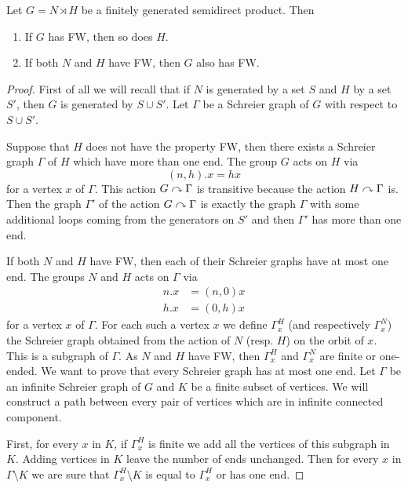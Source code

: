 \begin{lem}\label{Lemma:Semidirect_ends}
Let $G = N \rtimes H$ be a finitely generated semidirect product. Then
\begin{enumerate}
\item If $G$ has FW, then so does $H$.
\item If both $N$ and $H$ have FW, then $G$ also has FW.
\end{enumerate}
\end{lem}
%
\begin{proof}
First of all we will recall that if $N$ is generated by a set $S$ and $H$ by a set $S'$, then $G$ is generated by $S \cup S'$. Let $\Gamma$ be a Schreier graph of $G$ with respect to $S \cup S'$.

Suppose that $H$ does not have the property FW, then there exists a Schreier graph $\Gamma$ of $H$ which have more than one end. The group $G$ acts on $H$ via 
\begin{equation*}
(n,h).x = hx 
\end{equation*}
for a vertex $x$ of $\Gamma$. This action $G \curvearrowright \Gamma$ is transitive because the action $H \curvearrowright \Gamma$ is. Then the graph $\Gamma'$ of the action $G \curvearrowright \Gamma$ is exactly the graph $\Gamma$ with some additional loops coming from the generators on $S'$ and then $\Gamma'$ has more than one end.

If both $N$ and $H$ have FW, then each of their Schreier graphs have at most one end. The groups $N$ and $H$ acts on $\Gamma$ via
\begin{align*}
n.x &= (n,0)x \\
h.x &= (0,h)x
\end{align*}
for a vertex $x$ of $\Gamma$. For each such a vertex $x$ we define $\Gamma_x^H$ (and respectively $\Gamma_x^N$) the Schreier graph obtained from the action of $N$ (resp. $H$) on the orbit of $x$. This is a subgraph of $\Gamma$. As $N$ and $H$ have FW, then $\Gamma_x^H$ and $\Gamma_x^N$ are finite or one-ended. We want to prove that every Schreier graph has at most one end. Let $\Gamma$ be an infinite Schreier graph of $G$ and $K$ be a finite subset of vertices. We will construct a path between every pair of vertices which are in infinite connected component.

First, for every $x$ in $K$, if $\Gamma_x^H$ is finite we add all the vertices of this subgraph in $K$. Adding vertices in $K$ leave the number of ends unchanged. Then for every $x$ in $\Gamma \setminus K$ we are sure that $\Gamma_x^H \setminus K$ is equal to $\Gamma_x^H$ or has one end. 


\end{proof}
